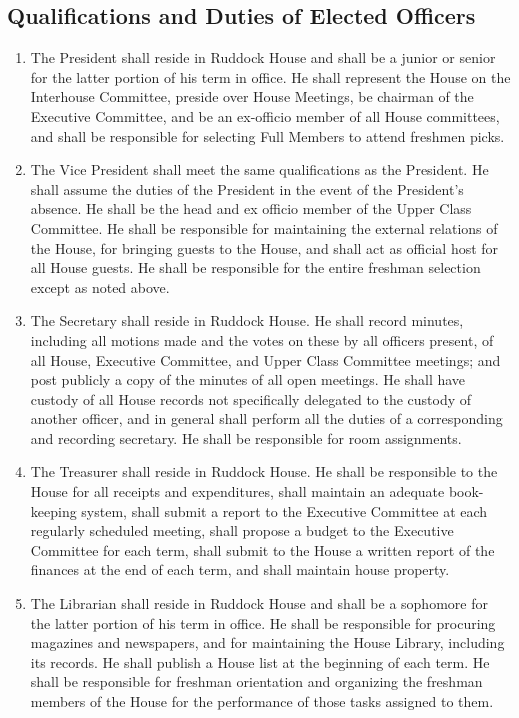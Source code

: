 \documentclass[10pt]{article} %
\begin{document}
\subsection{Qualifications and Duties of Elected Officers}
\begin{enumerate}
\item The President shall reside in Ruddock House and shall be a junior or senior for the latter portion of his term in office. He shall represent the House on the Interhouse Committee, preside over House Meetings, be chairman of the Executive Committee, and be an ex-officio member of all House committees, and shall be responsible for selecting Full Members to attend freshmen picks.
\item The Vice President shall meet the same qualifications as the President. He shall assume the duties of the President in the event of the President’s absence. He shall be the head and ex officio member of the Upper Class Committee. He shall be responsible for maintaining the external relations of the House, for bringing guests to the House, and shall act as official host for all House guests. He shall be responsible for the entire freshman selection except as noted above.
\item The Secretary shall reside in Ruddock House. He shall record minutes, including all motions made and the votes on these by all officers present, of all House, Executive Committee, and Upper Class Committee meetings; and post publicly a copy of the minutes of all open meetings. He shall have custody of all House records not specifically delegated to the custody of another officer, and in general shall perform all the duties of a corresponding and recording secretary. He shall be responsible for room assignments.
\item The Treasurer shall reside in Ruddock House. He shall be responsible to the House for all receipts and expenditures, shall maintain an adequate book-keeping system, shall submit a report to the Executive Committee at each regularly scheduled meeting, shall propose a budget to the Executive Committee for each term, shall submit to the House a written report of the finances at the end of each term, and shall maintain house property.
\item The Librarian shall reside in Ruddock House and shall be a sophomore for the latter portion of his term in office. He shall be responsible for procuring magazines and newspapers, and for maintaining the House Library, including its records. He shall publish a House list at the beginning of each term. He shall be responsible for freshman orientation and organizing the freshman members of the House for the performance of those tasks assigned to them.

\end{enumerate}
\end{document}
